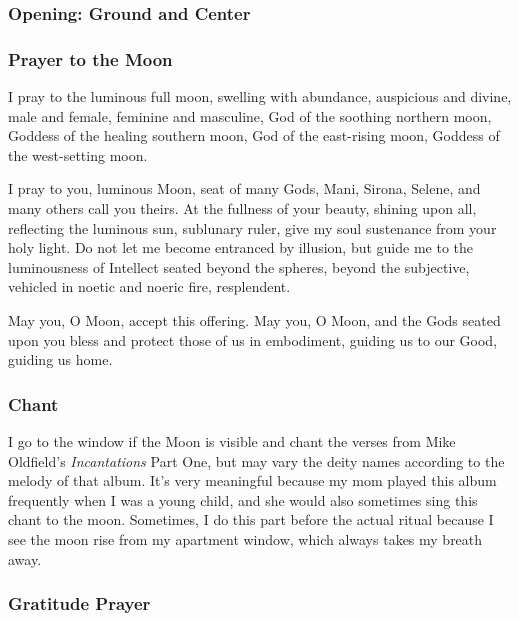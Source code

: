\documentclass[
]{book}
\begin{document}
\hypertarget{opening-ground-and-center-2}{%
\subsubsection{Opening: Ground and Center}\label{opening-ground-and-center-2}}

\hypertarget{prayer-to-the-moon-2}{%
\subsubsection{Prayer to the Moon}\label{prayer-to-the-moon-2}}

I pray to the luminous full moon,
swelling with abundance,
auspicious and divine,
male and female, feminine and masculine,
God of the soothing northern moon,
Goddess of the healing southern moon,
God of the east-rising moon,
Goddess of the west-setting moon.

I pray to you, luminous Moon, seat of many Gods,
Mani, Sirona, Selene, and many others call you theirs.
At the fullness of your beauty, shining upon all,
reflecting the luminous sun, sublunary ruler,
give my soul sustenance from your holy light.
Do not let me become entranced by illusion,
but guide me to the luminousness of Intellect
seated beyond the spheres, beyond the subjective,
vehicled in noetic and noeric fire, resplendent.

May you, O Moon, accept this offering.
May you, O Moon, and the Gods seated upon you
bless and protect those of us in embodiment,
guiding us to our Good, guiding us home.

\hypertarget{chant}{%
\subsubsection{Chant}\label{chant}}

I go to the window if the Moon is visible and chant the verses from Mike Oldfield's \emph{Incantations} Part One, but may vary the deity names according to the melody of that album. It's very meaningful because my mom played this album frequently when I was a young child, and she would also sometimes sing this chant to the moon. Sometimes, I do this part before the actual ritual because I see the moon rise from my apartment window, which always takes my breath away.

\hypertarget{gratitude-prayer-2}{%
\subsubsection{Gratitude Prayer}\label{gratitude-prayer-2}}
\end{document}
